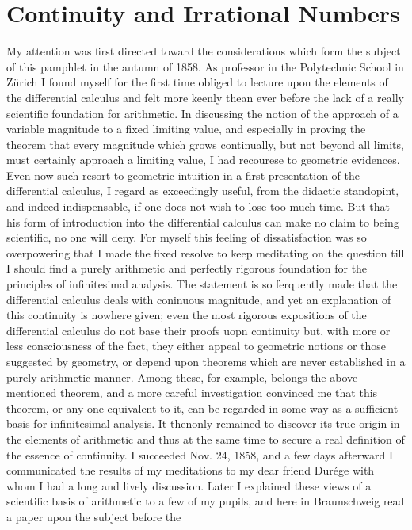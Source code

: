 \documentclass[oneside,12pt]{book}
\begin{document}
\chapter{Continuity and Irrational Numbers}
My attention was first directed toward the considerations which form the subject of this pamphlet in the autumn of 1858. As professor in the Polytechnic School in Z\"urich
I found myself for the first time obliged to lecture upon the elements of the differential calculus and felt more keenly thean ever before the lack of a really scientific 
foundation for arithmetic. In discussing the notion of the approach of a variable magnitude to a fixed limiting value, and especially in proving the theorem that every
magnitude which grows continually, but not beyond all limits, must certainly approach a limiting value, I had recourese to geometric evidences. Even now such resort to 
geometric intuition in a first presentation of the differential calculus, I regard as exceedingly useful, from the didactic standopint, and indeed indispensable, if one 
does not wish to lose too much time. But that his form of introduction into the differential calculus can make no claim to being scientific, no one will deny. For myself 
this feeling of dissatisfaction was so overpowering that I made the fixed resolve to keep meditating on the question till I should find a purely arithmetic and perfectly rigorous 
foundation for the principles of infinitesimal analysis. The statement is so ferquently made that the differential calculus deals with coninuous magnitude, and yet
an explanation of this continuity is nowhere given; even the most rigorous expositions of the differential calculus do not base their proofs uopn continuity but, with more or less
consciousness of the fact, they either appeal to geometric notions or those suggested by geometry, or depend upon theorems which are never established in a purely arithmetic manner.
Among these, for example, belongs the above-mentioned theorem, and a more careful investigation convinced me that this theorem, or any one equivalent to it, can be regarded in 
some way as a sufficient basis for infinitesimal analysis. It thenonly remained to discover its true origin in the elements of arithmetic and thus at the same time to secure a real 
definition of the essence of continuity. I succeeded Nov. 24, 1858, and a few days afterward I communicated the results of my meditations to my dear friend Dur\'ege with whom I had a long
and lively discussion. Later I explained these views of a scientific basis of arithmetic to a few of my pupils, and here in Braunschweig read a paper upon the subject before the 
\end{document}
